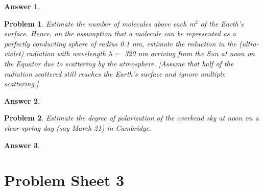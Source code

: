 \documentclass[a4paper]{article}
\newtheorem{ans}{Answer}[section]
\theoremstyle{new}
\newtheorem{qns}{Problem}[section]
\begin{document}
\begin{ans}

\end{ans}
\newpage
\begin{qns}
Estimate the number of molecules above each m$^2$ of the Earth’s surface. Hence, on the assumption that a molecule can be represented as a perfectly conducting sphere of radius 0.1 nm, estimate the reduction in the (ultra-violet) radiation with wavelength $\lambda=$ 320 nm arriving from the Sun at noon on the Equator due to scattering by the atmosphere.
[Assume that half of the radiation scattered still reaches the Earth’s surface and ignore multiple scattering.]
\end{qns}
\begin{ans}

\end{ans}
\begin{qns}
Estimate the degree of polarization of the overhead sky at noon on a clear spring day (say March 21) in Cambridge.
\end{qns}
\begin{ans}

\end{ans}
\newpage
\section{Problem Sheet 3}
\end{document}
